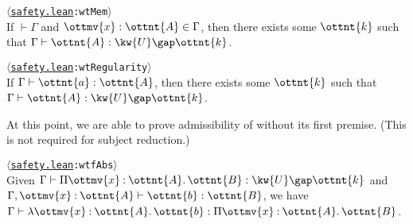 \documentclass[a4paper,UKenglish,cleveref,autoref,thm-restate]{lipics-v2021}
\newcommand{\repo}{https://github.com/ionathanch/TTBFL}
\newcommand{\thmref}[2]{%
  $\langle$\href{\repo/tree/main/src/#1}{\texttt{#1}}\texttt{:#2}$\rangle$%
}
\begin{document}
\begin{lemma} \thmref{safety.lean}{wtMem} \label{lem:wt:ctxt} \\
  If $ \mathop{\vdash}  \Gamma $ and $ \ottmv{x}  \mathrel{:}  \ottnt{A}  \in  \Gamma $,
  then there exists some $\ottnt{k}$ such that $ \Gamma  \vdash  \ottnt{A}  \mathrel{:}   \kw{U} \gap  \ottnt{k}  $.
\end{lemma}


\begin{lemma}[Regularity] \thmref{safety.lean}{wtRegularity} \label{lem:wt:reg} \\
  If $ \Gamma  \vdash  \ottnt{a}  \mathrel{:}  \ottnt{A} $, then there exists some $\ottnt{k}$ such that
  $ \Gamma  \vdash  \ottnt{A}  \mathrel{:}   \kw{U} \gap  \ottnt{k}  $.
\end{lemma}


At this point, we are able to prove admissibility of 
without its first premise. (This is not required for subject reduction.)

\begin{corollary} \thmref{safety.lean}{wtfAbs} \label{Lam'} \\
  Given $ \Gamma  \vdash   \Pi  \ottmv{x}  \mathbin{:}  \ottnt{A}  \mathpunct{.}  \ottnt{B}   \mathrel{:}   \kw{U} \gap  \ottnt{k}  $ and $  \Gamma ,  \ottmv{x}  \mathbin{:}  \ottnt{A}   \vdash  \ottnt{b}  \mathrel{:}  \ottnt{B} $,
  we have $ \Gamma  \vdash   \lambda  \ottmv{x}  \mathbin{:}  \ottnt{A}  \mathpunct{.}  \ottnt{b}   \mathrel{:}   \Pi  \ottmv{x}  \mathbin{:}  \ottnt{A}  \mathpunct{.}  \ottnt{B}  $.
\end{corollary}
\end{document}
